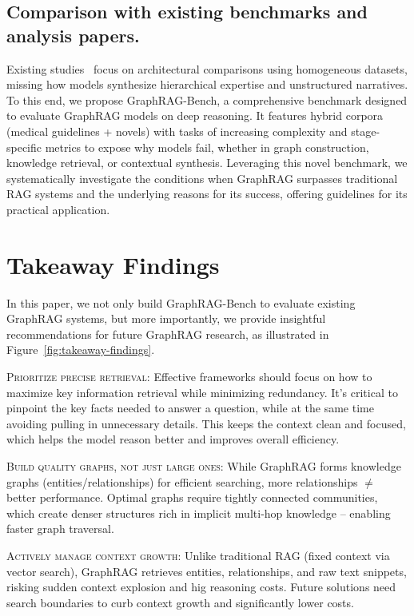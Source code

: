 \documentclass{article} %
\begin{document}
\subsection{Comparison with existing benchmarks and analysis papers.}
Existing studies~\citep {han2025rag,zhou2025depth} focus on architectural comparisons using homogeneous datasets, missing how models synthesize hierarchical expertise and unstructured narratives. To this end, we propose GraphRAG-Bench, a comprehensive benchmark designed to evaluate GraphRAG models on deep reasoning.  It features hybrid corpora (medical guidelines + novels) with tasks of increasing complexity and stage-specific metrics to expose why models fail, whether in graph construction, knowledge retrieval, or contextual synthesis.
Leveraging this novel benchmark, we systematically investigate the conditions when GraphRAG surpasses traditional RAG systems and the underlying reasons for its success, offering guidelines for its practical application. 

\section{Takeaway Findings}

In this paper, we not only build GraphRAG-Bench to evaluate existing GraphRAG systems, but more importantly, we provide insightful recommendations for future GraphRAG research, as illustrated in Figure~\ref{fig:takeaway-findings}. 

\textsc{Prioritize precise retrieval}: Effective frameworks should focus on how to maximize key information retrieval while minimizing redundancy. It's critical to pinpoint the key facts needed to answer a question, while at the same time avoiding pulling in unnecessary details. This keeps the context clean and focused, which helps the model reason better and improves overall efficiency.

\textsc{Build quality graphs, not just large ones}: While GraphRAG forms knowledge graphs (entities/relationships) for efficient searching, more relationships $\neq$ better performance. Optimal graphs require tightly connected communities, which create denser structures rich in implicit multi-hop knowledge – enabling faster graph traversal.

\textsc{Actively manage context growth}: Unlike traditional RAG (fixed context via vector search), GraphRAG retrieves entities, relationships, and raw text snippets, risking sudden context explosion and hig reasoning costs. Future solutions need search boundaries to curb context growth and significantly lower costs.
\end{document}
